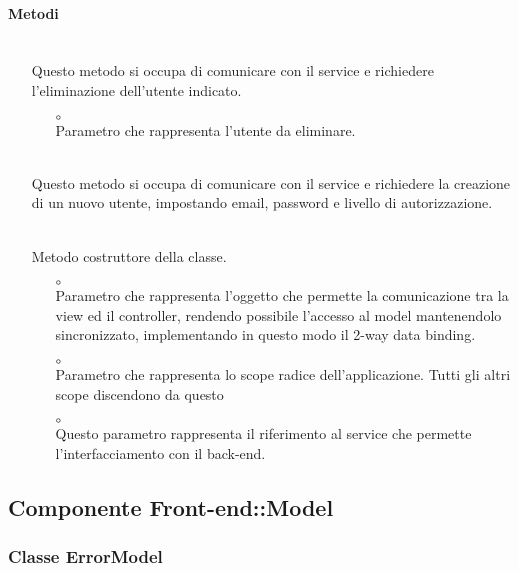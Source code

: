 \paragraph*{Metodi}
\begin{itemize}
\item[]  \\ Questo metodo si occupa di comunicare con il service e richiedere l'eliminazione dell'utente indicato.
\begin{itemize}\addtolength{\itemsep}{-0.5\baselineskip}
\item[$\circ$]  \\ Parametro che rappresenta l'utente da eliminare.
\end{itemize}
\item[]  \\ Questo metodo si occupa di comunicare con il service e richiedere la creazione di un nuovo utente, impostando email, password e livello di autorizzazione.
\item[]  \\ Metodo costruttore della classe. 
\begin{itemize}\addtolength{\itemsep}{-0.5\baselineskip}
\item[$\circ$]  \\ Parametro che rappresenta l'oggetto che permette la comunicazione tra la view ed il controller, rendendo possibile l’accesso al model mantenendolo sincronizzato, implementando in questo modo il 2-way data binding.
\item[$\circ$]  \\ Parametro che rappresenta lo scope radice dell'applicazione. Tutti gli altri scope discendono da questo
\item[$\circ$]  \\ Questo parametro rappresenta il riferimento al service che permette l'interfacciamento con il back-end.
\end{itemize}
\end{itemize}

\subsection{Componente Front-end::Model}

\subsubsection{Classe ErrorModel}

